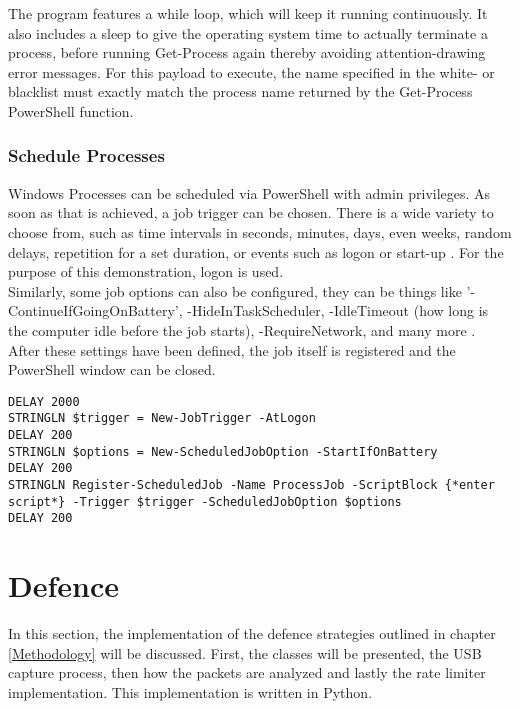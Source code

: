 The program features a while loop, which will keep it running continuously. It also includes a sleep to give the operating system time to actually terminate a process, before running Get-Process again thereby avoiding attention-drawing error messages. For this payload to execute, the name specified in the white- or blacklist must exactly match the process name returned by the Get-Process PowerShell function.



\subsubsection{Schedule Processes}

Windows Processes can be scheduled via PowerShell with admin privileges. As soon as that is achieved, a job trigger can be chosen. There is a wide variety to choose from, such as time intervals in seconds, minutes, days, even weeks, random delays, repetition for a set duration, or events such as logon or start-up \cite{sdwheelerNewJobTriggerPSScheduledJobPowerShell}.
For the purpose of this demonstration, logon is used. \\
Similarly, some job options can also be configured, they can be things like '-ContinueIfGoingOnBattery', -HideInTaskScheduler, -IdleTimeout (how long is the computer idle before the job starts), -RequireNetwork, and many more \cite{sdwheelerSetScheduledJobOptionPSScheduledJobPowerShell}. \\
After these settings have been defined, the job itself is registered and the PowerShell window can be closed. \\


\begin{lstlisting}[caption={Excerpt: register a scheduled job via PowerShell}, captionpos=b]
DELAY 2000
STRINGLN $trigger = New-JobTrigger -AtLogon
DELAY 200
STRINGLN $options = New-ScheduledJobOption -StartIfOnBattery
DELAY 200
STRINGLN Register-ScheduledJob -Name ProcessJob -ScriptBlock {*enter script*} -Trigger $trigger -ScheduledJobOption $options
DELAY 200
\end{lstlisting}


\section{Defence}

In this section, the implementation of the defence strategies outlined in chapter \ref{Methodology} will be discussed. First, the classes will be presented, the USB capture process, then how the packets are analyzed and lastly the rate limiter implementation. 
This implementation is written in Python.

